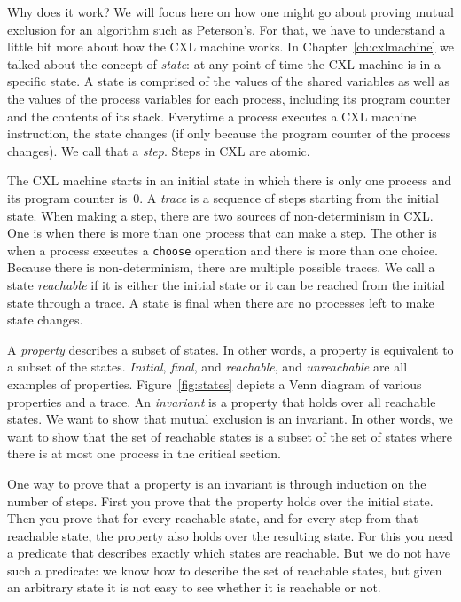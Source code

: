 \documentclass{report}
\begin{document}
Why does it work?  We will focus here on how one might go about proving
mutual exclusion for an algorithm such as Peterson's.
For that, we have to understand a little bit more about how the CXL
machine works.
In Chapter~\ref{ch:cxlmachine} we talked about the concept of \emph{state}:
at any point of time the CXL machine is in a specific state.
A state is comprised of the values of the shared variables as well as
the values of the process variables for each process, including its
program counter and the contents of its stack.
Everytime a process executes a CXL machine instruction, the
state changes (if only because the program counter of the process
changes).  We call that a \emph{step}.  Steps in CXL are atomic.

The CXL machine starts in an initial state in which there is only
one process and its program counter is~0.  A \emph{trace} is a
sequence of steps starting from the initial state.
When making a step, there are two sources of non-determinism in CXL.
One is when
there is more than one process that can make a step.  The other is
when a process executes a \texttt{choose} operation and there is
more than one choice.
Because there is non-determinism, there are multiple possible traces.
We call a state \emph{reachable} if it is either the initial state
or it can be reached from the initial state through a trace.
A state is final
when there are no processes left to make state changes.

A \emph{property} describes a subset of
states.  In other words, a property is equivalent to a subset of the states.
\emph{Initial}, \emph{final}, and \emph{reachable}, and \emph{unreachable}
are all examples of properties.
Figure~\ref{fig:states} depicts a Venn diagram of various properties
and a trace.
An \emph{invariant} is a property that holds over all reachable states.
We want to show that mutual exclusion is an invariant.
In other words, we want to show that the set of reachable states is a subset
of the set of states where there is at most one process in the critical
section.

One way to prove that a property is an invariant is through induction
on the number of steps.  First you prove that the property holds over
the initial state.  Then you prove that for every reachable state,
and for every step from that reachable state, the property also holds
over the resulting state.
For this you need a predicate that describes exactly which
states are reachable.
But we do not have such a predicate: we know how to describe the set
of reachable states, but given an arbitrary state it is not easy to
see whether it is reachable or not.
\end{document}
